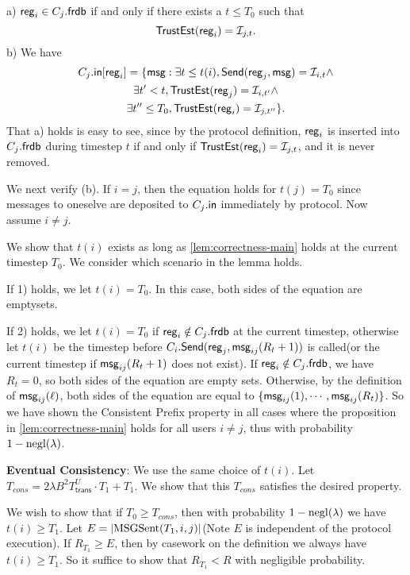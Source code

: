  a) $\mathsf{reg}_i \in C_j.\mathsf{frdb}$ if and only if there exists a $t \leq T_0$ such that 
 $$\mathsf{TrustEst}(\mathsf{reg}_i) = \mathcal{I}_{j, t}.$$
 b) We have
 \begin{multline*}
 C_j.\mathsf{in}[\mathsf{reg}_i] = \{\mathsf{msg}: \exists t \leq t(i), \mathsf{Send}(\mathsf{reg}_j, \mathsf{msg}) = \mathcal{I}_{i, t} \land \\
 \exists t' < t, \mathsf{TrustEst}(\mathsf{reg}_j) = \mathcal{I}_{i, t'} \land \\
 \exists t'' \leq T_0, \mathsf{TrustEst}(\mathsf{reg}_i) = \mathcal{I}_{j, t''}\}.   
 \end{multline*} 
 That a) holds is easy to see, since by the protocol definition, $\mathsf{reg}_i$ is inserted into $C_j.\mathsf{frdb}$ during timestep $t$ if and only if $\mathsf{TrustEst}(\mathsf{reg}_i) = \mathcal{I}_{j, t}$, and it is never removed. 
 
 We next verify (b). If $i = j$, then the equation holds for $t(j) = T_0$ since messages to oneselve are deposited to $C_j.\mathsf{in}$ immediately by protocol. Now assume $i \neq j.$ 
 
 We show that $t(i)$ exists as long as \cref{lem:correctness-main} holds at the current timestep $T_0$. We consider which scenario in the lemma holds. 
 
 If 1) holds, we let $t(i) = T_0$. In this case, both sides of the equation are emptysets.
 
 If 2) holds, we let $t(i) = T_0$ if $\mathsf{reg}_i \notin C_j.\mathsf{frdb}$ at the current timestep, otherwise let $t(i)$ be the timestep before $C_i.\mathsf{Send}(\mathsf{reg}_j, \mathsf{msg}_{ij}(R_{t} + 1))$ is called(or the current timestep if $\mathsf{msg}_{ij}(R_{t} + 1)$ does not exist). If $\mathsf{reg}_i \notin C_j.\mathsf{frdb}$, we have $R_t = 0$, so both sides of the equation are empty sets. Otherwise, by the definition of $\mathsf{msg}_{ij}(\ell)$, both sides of the equation are equal to $\{\mathsf{msg}_{ij}(1),\cdots, \mathsf{msg}_{ij}(R_t)\}$. So we have shown the Consistent Prefix property in all cases where the proposition in \cref{lem:correctness-main} holds for all users $i \neq j$, thus with probability $1 - \operatorname{negl}(\lambda)$.
 
 \textbf{Eventual Consistency}: We use the same choice of $t(i)$. Let $T_{cons} = 2\lambda B^2 T^U_{\mathsf{trans}} \cdot T_1 + T_1.$ We show that this $T_{cons}$ satisfies the desired property. 
 
 We wish to show that if $T_0 \geq T_{cons}$, then with probability $1 - \operatorname{negl}(\lambda)$ we have $t(i) \geq T_1$. Let $E = \left| \text{MSGSent}(T_1, i, j) \right|$(Note $E$ is independent of the protocol execution). If $R_{T_1} \geq E$, then by casework on the definition we always have $t(i) \geq T_1$. So it suffice to show that $R_{T_1} < R$ with negligible probability. 
 
